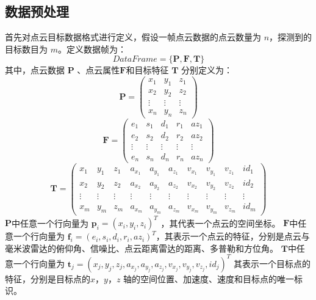 \subsection{数据预处理}
\label{subsec:data preprocessing}
首先对点云目标数据格式进行定义，假设一帧点云数据的点云数量为 $n$，探测到的目标数目为 $m$。定义数据帧为：
\begin{equation}
    DataFrame = \{\mathbf{P},\mathbf{F}, \mathbf{T}\}
\end{equation} 
其中，点云数据 $\mathbf{P}$ 、点云属性$\mathbf{F}$和目标特征 $\mathbf{T}$ 分别定义为：
\begin{equation}
    \mathbf{P} = \begin{pmatrix}
        x_1 & y_1 & z_1 \\
        x_2 & y_2 & z_2 \\
        \vdots & \vdots & \vdots \\
        x_n & y_n & z_n
    \end{pmatrix}
\end{equation}
\begin{equation}
    \mathbf{F} = \begin{pmatrix}
        e_1 & s_1 & d_1 & r_1 & az_1 \\
        e_2 & s_2 & d_2 & r_2 & az_2 \\
        \vdots & \vdots & \vdots & \vdots & \vdots \\
        e_n & s_n & d_n & r_n & az_n
    \end{pmatrix}
\end{equation}
\begin{equation}
    \mathbf{T} = \begin{pmatrix}
        x_1 & y_1 & z_1 & a_{x_1} & a_{y_1} & a_{z_1} & v_{x_1} & v_{y_1} & v_{z_1} & id_1 \\
        x_2 & y_2 & z_2 & a_{x_2} & a_{y_2} & a_{z_2} & v_{x_2} & v_{y_2} & v_{z_2} & id_2 \\
        \vdots & \vdots & \vdots & \vdots & \vdots & \vdots & \vdots & \vdots & \vdots & \vdots \\
        x_m & y_m & z_m & a_{x_m} & a_{y_m} & a_{z_m} & v_{x_m} & v_{y_m} & v_{z_m} & id_m
    \end{pmatrix}
\end{equation}
$\mathbf{P}$中任意一个行向量为 $\mathbf{p}_i = (x_i, y_i, z_i)^T$ ，其代表一个点云的空间坐标。
$\mathbf{F}$中任意一个行向量为 $\mathbf{f}_i = (e_i, s_i, d_i, r_i, az_i)^T$，其表示一个点云的特征，分别是点云与毫米波雷达的俯仰角、信噪比、点云距离雷达的距离、多普勒和方位角。
$\mathbf{T}$中任意一个行向量为 $\mathbf{t}_j = (x_j, y_j, z_j, a_{x_j}, a_{y_j}, a_{z_j}, v_{x_j}, v_{y_j}, v_{z_j}, id_j)^T$ 其表示一个目标点的特征，分别是目标点的$x$，$y$，$z$ 轴的空间位置、加速度、速度和目标点的唯一标识。

